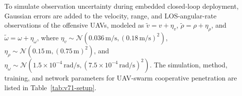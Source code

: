 \documentclass{cja}
\begin{document}
To simulate observation uncertainty during embedded closed-loop deployment, Gaussian errors are added to the velocity, range, and LOS-angular-rate observations of the offensive UAVs, modeled as $\tilde v=v+\eta_v$, $\tilde\rho=\rho+\eta_\rho$, and $\tilde\omega=\omega+\eta_\omega$, where $\eta_v\sim\mathcal{N}\!\left(0.036\,\mathrm{m/s},(0.18\,\mathrm{m/s})^2\right)$, $\eta_\rho\sim\mathcal{N}\!\left(0.15\,\mathrm{m},(0.75\,\mathrm{m})^2\right)$, and $\eta_\omega\sim\mathcal{N}\!\left(1.5\times10^{-4}\,\mathrm{rad/s},(7.5\times10^{-4}\,\mathrm{rad/s})^2\right)$.
The simulation, method, training, and network parameters for UAV-swarm cooperative penetration are listed in Table~\ref{tab:v71-setup}.

\begin{table}[!t]
\centering
\scriptsize
\setlength{\tabcolsep}{2.0pt}
\renewcommand{\arraystretch}{1.05}
\caption{Simulation and training parameter settings}
\label{tab:v71-setup}
\label{tab:training-hyperparameters}
\end{table}
\end{document}
